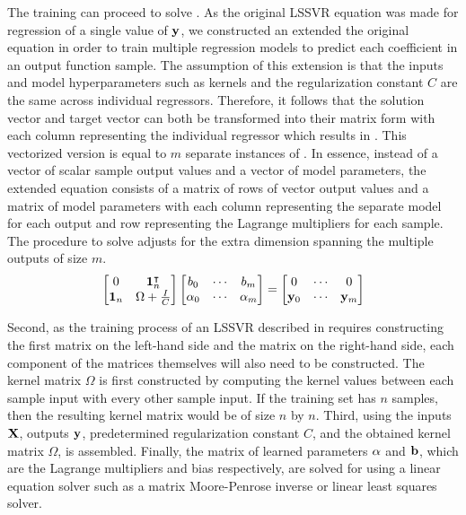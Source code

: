 The training can proceed to solve . As the original LSSVR equation was made for regression of a single value of \(\vb{y} \), we constructed an extended the original equation in order to train multiple regression models to predict each coefficient in an output function sample. The assumption of this extension is that the inputs and model hyperparameters such as kernels and the regularization constant \(C \) are the same across individual regressors. Therefore, it follows that the solution vector and target vector can both be transformed into their matrix form with each column representing the individual regressor which results in . This vectorized version is equal to \(m \) separate instances of . In essence, instead of a vector of scalar sample output values and a vector of model parameters, the extended equation consists of a matrix of rows of vector output values and a matrix of model parameters with each column representing the separate model for each output and row representing the Lagrange multipliers for each sample. The procedure to solve  adjusts  for the extra dimension spanning the multiple outputs of size \(m\).
\begin{equation} \label{eq:lssvr_solution_vectorized}
  \begin{bmatrix}
    0          & \vb{1}_{n}^{\intercal} \\
    \vb{1}_{n} & \Omega + \frac{I}{C}
  \end{bmatrix}
  \begin{bmatrix}
    b_0           & \cdots & b_m           \\
    \vb{\alpha}_0 & \cdots & \vb{\alpha}_m \\
  \end{bmatrix}
  =
  \begin{bmatrix}
    0        & \cdots & 0        \\
    \vb{y}_0 & \cdots & \vb{y}_m \\
  \end{bmatrix}
\end{equation}

Second, as the training process of an LSSVR described in requires constructing the first matrix on the left-hand side and the matrix on the right-hand side, each component of the matrices themselves will also need to be constructed. The kernel matrix \(\Omega \) is first constructed by computing the kernel values between each sample input with every other sample input. If the training set has \(n \) samples, then the resulting kernel matrix would be of size \(n \) by \(n \).
Third, using the inputs \(\vb{X}\), outputs \(\vb{y}\), predetermined regularization constant \(C \), and the obtained kernel matrix \(\Omega \),  is assembled. Finally, the matrix of learned parameters \(\vb{\alpha}\) and \(\vb{b}\), which are the Lagrange multipliers and bias respectively, are solved for using a linear equation solver such as a matrix Moore-Penrose inverse or linear least squares solver.

